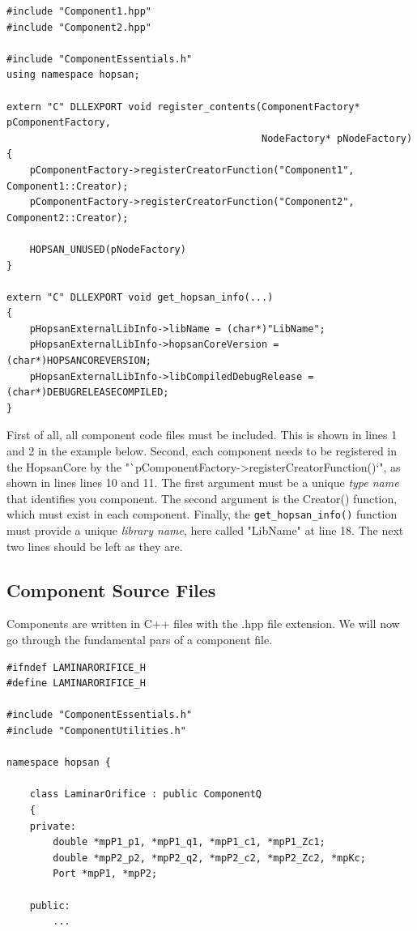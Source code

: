 \documentclass[a4paper,pdftex]{article}
\begin{document}
\begin{minipage}{\linewidth}
\begin{lstlisting}[basicstyle=\footnotesize\ttfamily]
#include "Component1.hpp"
#include "Component2.hpp"

#include "ComponentEssentials.h"
using namespace hopsan;

extern "C" DLLEXPORT void register_contents(ComponentFactory* pComponentFactory, 
                                            NodeFactory* pNodeFactory)
{    
    pComponentFactory->registerCreatorFunction("Component1", Component1::Creator);
    pComponentFactory->registerCreatorFunction("Component2", Component2::Creator);

    HOPSAN_UNUSED(pNodeFactory)
}

extern "C" DLLEXPORT void get_hopsan_info(...)
{
    pHopsanExternalLibInfo->libName = (char*)"LibName";
    pHopsanExternalLibInfo->hopsanCoreVersion = (char*)HOPSANCOREVERSION;
    pHopsanExternalLibInfo->libCompiledDebugRelease = (char*)DEBUGRELEASECOMPILED;
}
\end{lstlisting}
\end{minipage}

\noindent First of all, all component code files must be included. This is shown in lines 1 and 2 in the example below.
Second, each component needs to be registered in the HopsanCore by the "`pComponentFactory->registerCreatorFunction()`", as shown in lines  lines 10 and 11.
The first argument must be a unique \textit{type name} that identifies you component. 
The second argument is the Creator() function, which must exist in each component.
Finally, the \texttt{get\_hopsan\_info()} function must provide a unique \textit{library name}, here called "LibName" at line 18. 
The next two lines should be left as they are.

\subsection*{Component Source Files}
Components are written in C++ files with the .hpp file extension. 
We will now go through the fundamental pars of a component file.\\

\begin{minipage}{\linewidth}
\begin{lstlisting}[basicstyle=\footnotesize\ttfamily]
#ifndef LAMINARORIFICE_H
#define LAMINARORIFICE_H

#include "ComponentEssentials.h"
#include "ComponentUtilities.h"

namespace hopsan {

    class LaminarOrifice : public ComponentQ
    {
    private:
        double *mpP1_p1, *mpP1_q1, *mpP1_c1, *mpP1_Zc1;
        double *mpP2_p2, *mpP2_q2, *mpP2_c2, *mpP2_Zc2, *mpKc;
        Port *mpP1, *mpP2;
       
    public:
        ...
\end{lstlisting}
\end{minipage}
\end{document}
